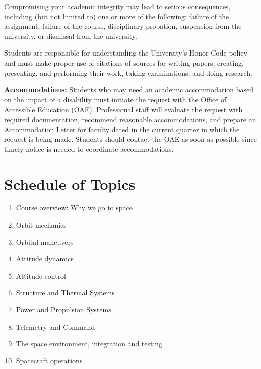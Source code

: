 \documentclass[11pt,letterpaper]{article}
\begin{document}
Compromising your academic integrity may lead to serious consequences, including (but not limited to) one or more of the following: failure of the assignment, failure of the course, disciplinary probation, suspension from the university, or dismissal from the university.

Students are responsible for understanding the University's Honor Code policy and must make proper use of citations of sources for writing papers, creating, presenting, and performing their work, taking examinations, and doing research.

\medskip
\noindent
\textbf{Accommodations:} Students who may need an academic accommodation based on the impact of a disability must initiate the request with the Office of Accessible Education (OAE). Professional staff will evaluate the request with required documentation, recommend reasonable accommodations, and prepare an Accommodation Letter for faculty dated in the current quarter in which the request is being made. Students should contact the OAE as soon as possible since timely notice is needed to coordinate accommodations.


\section*{Schedule of Topics}

\begin{enumerate}[label=\textbf{Week \arabic*:},leftmargin=3.5\parindent]
	\item Course overview: Why we go to space
	\item Orbit mechanics
	\item Orbital maneuvers
	\item Attitude dynamics
	\item Attitude control
	\item Structure and Thermal Systems
	\item Power and Propulsion Systems
	\item Telemetry and Command
	\item The space environment, integration and testing
	\item Spacecraft operations
\end{enumerate}
\end{document}

